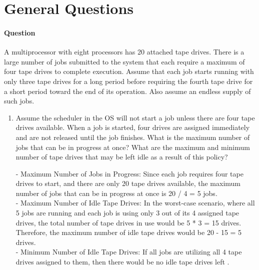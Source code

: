 \documentclass[a4paper,12pt,fleqn]{article}
\newcounter{question}
\newcommand*\question{%
\stepcounter{question}%
\paragraph{Question \thequestion}}
\begin{document}
\section{General Questions}
\question 
{
A multiprocessor with eight processors has 20 attached tape drives. There is a large number of jobs
submitted to the system that each require a maximum of four tape drives to complete execution.
Assume that each job starts running with only three tape drives for a long period before requiring
the fourth tape drive for a short period toward the end of its operation. Also assume an endless
supply of such jobs.
}
\begin{enumerate}

\item
{
Assume the scheduler in the OS will not start a job unless there are four tape drives
available. When a job is started, four drives are assigned immediately and are not released
until the job finishes. What is the maximum number of jobs that can be in progress at once?
What are the maximum and minimum number of tape drives that may be left idle as a result
of this policy?
}
\begin{answer}
{
- Maximum Number of Jobs in Progress: Since each job requires four tape drives to start, and there are only 20 tape drives available, the maximum number of jobs that can be in progress at once is 20 / 4 = 5 jobs.\\
- Maximum Number of Idle Tape Drives: In the worst-case scenario, where all 5 jobs are running and each job is using only 3 out of its 4 assigned tape drives, the total number of tape drives in use would be 5 * 3 = 15 drives. Therefore, the maximum number of idle tape drives would be 20 - 15 = 5 drives.\\
- Minimum Number of Idle Tape Drives: If all jobs are utilizing all 4 tape drives assigned to them, then there would be no idle tape drives left
}.
\end{answer}


\end{enumerate}
\end{document}
